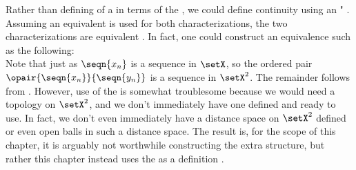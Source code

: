 \begin{remark}
Rather than defining  of a  in terms of 
the  ,
we could define continuity using an " .
Assuming an equivalent  is used for both characterizations, the 
two characterizations are equivalent .
In fact, one could construct an equivalence such as the following:
\\
Note that just as $\seqn{x_n}$ is a sequence in $\setX$, so the ordered pair $\opair{\seqn{x_n}}{\seqn{y_n}}$
is a sequence in $\setX^2$.
The remainder %
follows from .
However, use of the  is somewhat troublesome
because we would need a topology on $\setX^2$, and we don't immediately have one defined and ready to use.
In fact, we don't even immediately have a distance space on $\setX^2$ defined or even open balls in such a distance space.
The result is, for the scope of this chapter, it is arguably not worthwhile constructing the extra structure, 
but rather this chapter instead
uses the  as a definition .
\end{remark}




